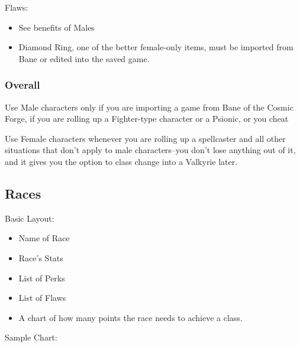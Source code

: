 \documentclass[12pt]{article}
\providecommand{\tightlist}{%
  \setlength{\itemsep}{0pt}\setlength{\parskip}{0pt}}
\begin{document}
Flaws:

\begin{itemize}
\item
  See benefits of Males
\item
  Diamond Ring, one of the better female-only items, must be imported
  from Bane or edited into the saved game.
\end{itemize}

\subsubsection{Overall}\label{overall}

Use Male characters only if you are importing a game from Bane of the
Cosmic Forge, if you are rolling up a Fighter-type character or a
Psionic, or you cheat

Use Female characters whenever you are rolling up a spellcaster and all
other situations that don't apply to male characters--you don't lose
anything out of it, and it gives you the option to class change into a
Valkyrie later.

\subsection{Races}\label{races}

Basic Layout:

\begin{itemize}
\tightlist
\item Name of Race
\item Race's Stats
\item List of Perks
\item List of Flaws
\item A chart of how many points the race needs to achieve a class.
\end{itemize}

Sample Chart:
\end{document}
